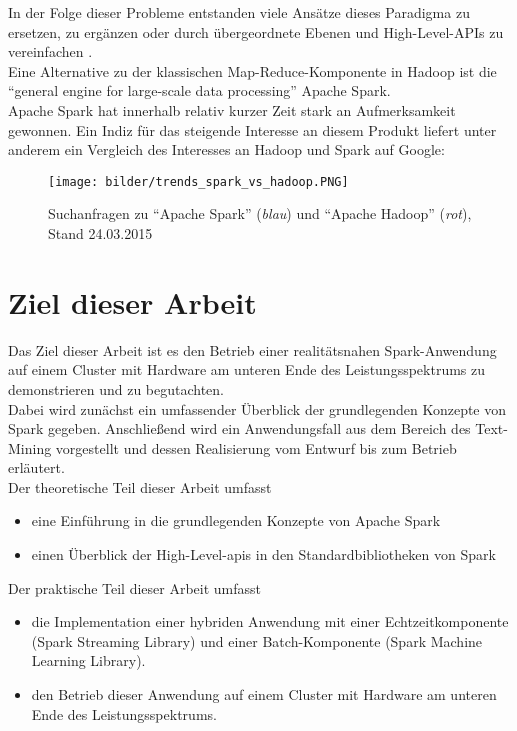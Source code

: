In der Folge dieser Probleme entstanden viele Ansätze dieses Paradigma zu ersetzen, zu ergänzen oder durch übergeordnete Ebenen und High-Level-APIs zu vereinfachen \cite{Sin14}.\\

Eine Alternative zu der klassischen Map-Reduce-Komponente in Hadoop ist die "`general engine for large-scale data processing"' Apache Spark.\\

Apache Spark hat innerhalb relativ kurzer Zeit stark an Aufmerksamkeit gewonnen. Ein Indiz für das steigende Interesse an diesem Produkt liefert unter anderem ein Vergleich des Interesses an Hadoop und Spark auf Google:\\

\begin{figure}[h]
\texttt{[image: bilder/trends\_spark\_vs\_hadoop.PNG]}
\caption[Google Trends]{Suchanfragen zu "`Apache Spark"' (\textit{blau}) und "`Apache Hadoop"' (\textit{rot}), Stand 24.03.2015 \cite{googletrends}}
\end{figure}

\section{Ziel dieser Arbeit}
Das Ziel dieser Arbeit ist es den Betrieb einer realitätsnahen Spark-Anwendung auf einem Cluster mit Hardware am unteren Ende des Leistungsspektrums zu demonstrieren und zu begutachten.\\
Dabei wird zunächst ein umfassender Überblick der grundlegenden Konzepte von Spark gegeben. Anschließend wird ein Anwendungsfall aus dem Bereich des Text-Mining vorgestellt und dessen Realisierung vom Entwurf bis zum Betrieb erläutert.\\

Der theoretische Teil dieser Arbeit umfasst
\begin{itemize}
  \item eine Einführung in die grundlegenden Konzepte von Apache Spark 
	\item einen Überblick der High-Level-\glspl{api} in den Standardbibliotheken von Spark
\end{itemize}

Der praktische Teil dieser Arbeit umfasst
\begin{itemize}
\item die Implementation einer hybriden Anwendung mit einer Echtzeitkomponente (Spark Streaming Library) und einer Batch-Komponente (Spark Machine Learning Library).
\item den Betrieb dieser Anwendung auf einem Cluster mit Hardware am unteren Ende des Leistungsspektrums.
\end{itemize}

